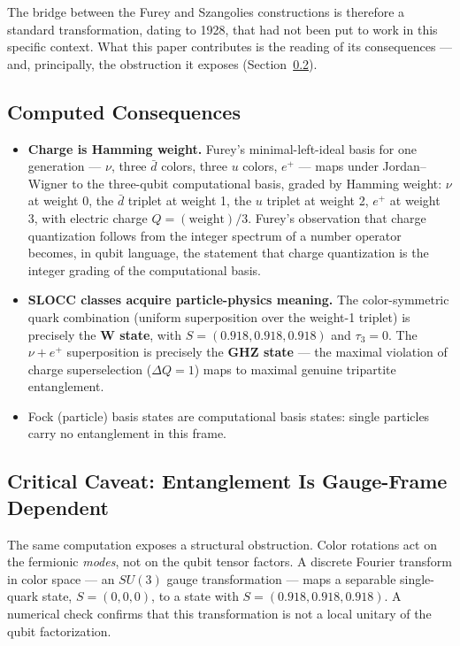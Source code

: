 \documentclass[11pt]{article}
\begin{document}
The bridge between the Furey and Szangolies constructions is therefore a standard transformation, dating to 1928, that had not been put to work in this specific context. What this paper contributes is the reading of its consequences --- and, principally, the obstruction it exposes (Section~\ref{sec:obstruction}).

\subsection{Computed Consequences}
\label{sec:jwconsequences}

\begin{itemize}

\item \textbf{Charge is Hamming weight.} Furey's minimal-left-ideal basis for one generation --- $\nu$, three $\bar{d}$ colors, three $u$ colors, $e^+$ --- maps under Jordan--Wigner to the three-qubit computational basis, graded by Hamming weight: $\nu$ at weight 0, the $\bar{d}$ triplet at weight 1, the $u$ triplet at weight 2, $e^+$ at weight 3, with electric charge $Q = (\text{weight})/3$. Furey's observation that charge quantization follows from the integer spectrum of a number operator \cite{furey18} becomes, in qubit language, the statement that charge quantization is the integer grading of the computational basis.

\item \textbf{SLOCC classes acquire particle-physics meaning.} The color-symmetric quark combination (uniform superposition over the weight-1 triplet) is precisely the \textbf{W state}, with $S = (0.918, 0.918, 0.918)$ and $\tau_3 = 0$. The $\nu + e^+$ superposition is precisely the \textbf{GHZ state} --- the maximal violation of charge superselection ($\Delta Q = 1$) maps to maximal genuine tripartite entanglement.

\item Fock (particle) basis states are computational basis states: single particles carry no entanglement in this frame.

\end{itemize}

\subsection{Critical Caveat: Entanglement Is Gauge-Frame Dependent}
\label{sec:obstruction}

The same computation exposes a structural obstruction. Color rotations act on the fermionic \emph{modes}, not on the qubit tensor factors. A discrete Fourier transform in color space --- an $SU(3)$ gauge transformation --- maps a separable single-quark state, $S = (0, 0, 0)$, to a state with $S = (0.918, 0.918, 0.918)$. A numerical check confirms that this transformation is not a local unitary of the qubit factorization.
\end{document}
